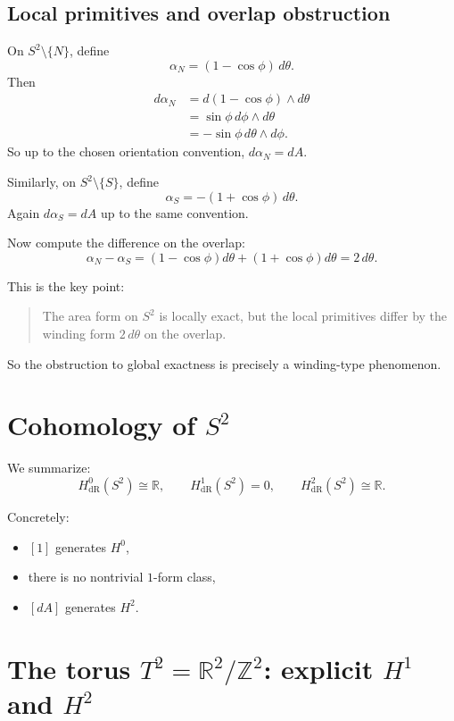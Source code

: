 \documentclass[11pt]{article}
\begin{document}
	\subsection*{Local primitives and overlap obstruction}
	
	On \(S^2\setminus\{N\}\), define
	\[
	\alpha_N=(1-\cos\phi)\,d\theta.
	\]
	Then
	\begin{align*}
		d\alpha_N
		&=
		d(1-\cos\phi)\wedge d\theta\\
		&=
		\sin\phi\,d\phi\wedge d\theta\\
		&=
		-\sin\phi\,d\theta\wedge d\phi.
	\end{align*}
	So up to the chosen orientation convention, \(d\alpha_N=dA\).
	
	Similarly, on \(S^2\setminus\{S\}\), define
	\[
	\alpha_S=-(1+\cos\phi)\,d\theta.
	\]
	Again \(d\alpha_S=dA\) up to the same convention.
	
	Now compute the difference on the overlap:
	\[
	\alpha_N-\alpha_S
	=
	(1-\cos\phi)d\theta+(1+\cos\phi)d\theta
	=
	2\,d\theta.
	\]
	
	This is the key point:
	\begin{quote}
		The area form on \(S^2\) is locally exact, but the local primitives differ by the winding form \(2\,d\theta\) on the overlap.
	\end{quote}
	
	So the obstruction to global exactness is precisely a winding-type phenomenon.
	
	\section{Cohomology of \(S^2\)}
	
	We summarize:
	\[
	H^0_{\mathrm{dR}}(S^2)\cong\mathbb{R},
	\qquad
	H^1_{\mathrm{dR}}(S^2)=0,
	\qquad
	H^2_{\mathrm{dR}}(S^2)\cong\mathbb{R}.
	\]
	
	Concretely:
	\begin{itemize}[leftmargin=2em]
		\item \([1]\) generates \(H^0\),
		\item there is no nontrivial \(1\)-form class,
		\item \([dA]\) generates \(H^2\).
	\end{itemize}
	
	\section{The torus \(T^2=\mathbb{R}^2/\mathbb{Z}^2\): explicit \(H^1\) and \(H^2\)}
	
\end{document}
